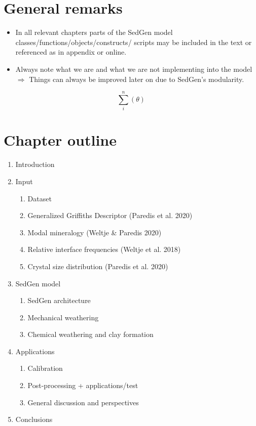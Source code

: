 \section{General remarks}
    \begin{itemize}
        \item In all relevant chapters parts of the SedGen model classes/functions/objects/constructs/ scripts may be included in the text or referenced as in appendix or online. %
        \item Always note what we are and what we are not implementing into the model \(\Rightarrow\) Things can always be improved later on due to SedGen’s modularity. %
    \end{itemize}

\begin{equation}
  \sum_{i}^{n}(\theta)
\end{equation}

\section{Chapter outline}
    \begin{enumerate}
        \item Introduction

        \item Input
        \begin{enumerate}
            \item Dataset
            \item Generalized Griffiths Descriptor (Paredis et al. 2020)
            \item Modal mineralogy (Weltje \& Paredis 2020)
            \item Relative interface frequencies (Weltje et al. 2018)
            \item Crystal size distribution (Paredis et al. 2020)
        \end{enumerate}

        \item SedGen model
        \begin{enumerate}
            \item SedGen architecture
            \item Mechanical weathering
            \item Chemical weathering and clay formation
        \end{enumerate}

        \item Applications
        \begin{enumerate}
            \item Calibration
            \item Post-processing + applications/test
            \item General discussion and perspectives
        \end{enumerate}

        \item Conclusions
    \end{enumerate}


